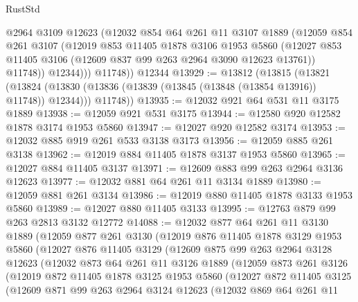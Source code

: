 \begin{lexlean}{RustStd}
\begin{coremodule}
            @2964
            @3109
            @12623
            (@12032
              @854
              @64
              @261
              @11
              @3107
              @1889
              (@12059
                @854
                @261
                @3107
                (@12019
                  @853
                  @11405
                  @1878
                  @3106
                  @1953
                  @5860
                  (@12027 @853 @11405 @3106 (@12609 @837 @99 @263 @2964 @3090 @12623 @13761))
                  @11748))
              @12344)))
        @11748))
    @12344
@13929 := @13812
    (@13815
      (@13821
        (@13824 (@13830 (@13836 (@13839 (@13845 (@13848 (@13854 @13916)) @11748)) @12344)))
        @11748))
@13935 := @12032 @921 @64 @531 @11 @3175 @1889
@13938 := @12059 @921 @531 @3175
@13944 := @12580 @920 @12582 @1878 @3174 @1953 @5860
@13947 := @12027 @920 @12582 @3174
@13953 := @12032 @885 @919 @261 @533 @3138 @3173
@13956 := @12059 @885 @261 @3138
@13962 := @12019 @884 @11405 @1878 @3137 @1953 @5860
@13965 := @12027 @884 @11405 @3137
@13971 := @12609 @883 @99 @263 @2964 @3136 @12623
@13977 := @12032 @881 @64 @261 @11 @3134 @1889
@13980 := @12059 @881 @261 @3134
@13986 := @12019 @880 @11405 @1878 @3133 @1953 @5860
@13989 := @12027 @880 @11405 @3133
@13995 := @12763 @879 @99 @263 @2813 @3132 @12772
@14088 := @12032
    @877
    @64
    @261
    @11
    @3130
    @1889
    (@12059
      @877
      @261
      @3130
      (@12019
        @876
        @11405
        @1878
        @3129
        @1953
        @5860
        (@12027
          @876
          @11405
          @3129
          (@12609
            @875
            @99
            @263
            @2964
            @3128
            @12623
            (@12032
              @873
              @64
              @261
              @11
              @3126
              @1889
              (@12059
                @873
                @261
                @3126
                (@12019
                  @872
                  @11405
                  @1878
                  @3125
                  @1953
                  @5860
                  (@12027
                    @872
                    @11405
                    @3125
                    (@12609
                      @871
                      @99
                      @263
                      @2964
                      @3124
                      @12623
                      (@12032
                        @869
                        @64
                        @261
                        @11

\end{coremodule}
\end{lexlean}
